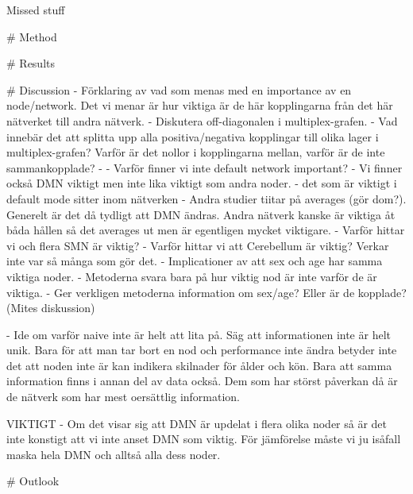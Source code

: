Missed stuff

# Method


# Results

# Discussion 
    - Förklaring av vad som menas med en importance av en node/network. Det vi menar är hur viktiga är de här kopplingarna från det här nätverket till andra nätverk.
    - Diskutera off-diagonalen i multiplex-grafen.
    - Vad innebär det att splitta upp alla positiva/negativa kopplingar till olika lager i multiplex-grafen? Varför är det nollor i kopplingarna mellan, varför är de inte sammankopplade?
    - 
    - Varför finner vi inte default network important?
        - Vi finner också DMN viktigt men inte lika viktigt som andra noder.
        - det som är viktigt i default mode sitter inom nätverken
        - Andra studier tiitar på averages (gör dom?). Generelt är det då tydligt att DMN ändras. Andra nätverk kanske är viktiga åt båda hållen så det averages ut men är egentligen mycket viktigare. 
    - Varför hittar vi och flera SMN är viktig?
    - Varför hittar vi att Cerebellum är viktig? Verkar inte var så många som gör det. 
    - Implicationer av att sex och age har samma viktiga noder. 
    - Metoderna svara bara på hur viktig nod är inte varför de är viktiga. 
    - Ger verkligen metoderna information om sex/age? Eller är de kopplade? (Mites diskussion)
    
    
    - Ide om varför naive inte är helt att lita på. Säg att informationen inte är helt unik. Bara för att man tar bort en nod och performance inte ändra betyder inte det att noden inte är kan indikera skilnader för ålder och kön. Bara att samma information finns i annan del av data också. Dem som har störst påverkan då är de nätverk som har mest oersättlig information. 
    
    
    VIKTIGT
    - Om det visar sig att DMN är updelat i flera olika noder så är det inte konstigt att vi inte anset DMN som viktig. För jämförelse måste vi ju isåfall maska hela DMN och alltså alla dess noder.
    
# Outlook